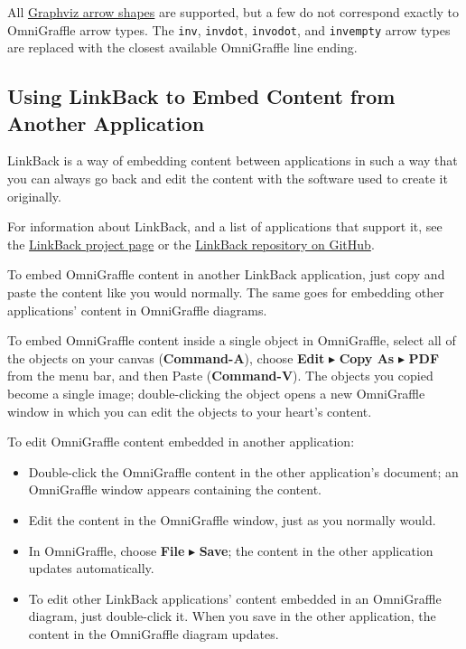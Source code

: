 \documentclass[../main.tex]{subfiles}
\begin{document}
\begin{ognote}
  All \href{http://www.graphviz.org/content/arrow-shapes}{Graphviz arrow shapes} are supported,
  but a few do not correspond exactly to OmniGraffle arrow types. The \texttt{inv},
  \texttt{invdot}, \texttt{invodot}, and \texttt{invempty} arrow types are replaced with the
  closest available OmniGraffle line ending.
\end{ognote}

\subsection{Using LinkBack to Embed Content from Another Application}

LinkBack is a way of embedding content between applications in such a way that you can always go
back and edit the content with the software used to create it originally.

\begin{ognote}
  For information about LinkBack, and a list of applications that support it, see the
  \href{http://linkback.org}{LinkBack project page} or the
  \href{http://github.com/omnigroup/LinkBack}{LinkBack repository on GitHub}.
\end{ognote}

To embed OmniGraffle content in another LinkBack application, just copy and paste the content
like you would normally. The same goes for embedding other applications' content in
OmniGraffle diagrams.

To embed OmniGraffle content inside a single object in OmniGraffle, select all of the objects on
your canvas (\textbf{Command-A}), choose \textbf{Edit} $\blacktriangleright$ \textbf{Copy As}
$\blacktriangleright$ \textbf{PDF} from the menu bar, and then Paste (\textbf{Command-V}). The
objects you copied become a single image; double-clicking the object opens a new OmniGraffle
window in which you can edit the objects to your heart's content.

To edit OmniGraffle content embedded in another application:

\begin{itemize}
  \item Double-click the OmniGraffle content in the other application's document; an OmniGraffle
    window appears containing the content.
  \item Edit the content in the OmniGraffle window, just as you normally would.
  \item In OmniGraffle, choose \textbf{File} $\blacktriangleright$ \textbf{Save}; the content in
    the other application updates automatically.
  \item To edit other LinkBack applications' content embedded in an OmniGraffle diagram, just
    double-click it. When you save in the other application, the content in the OmniGraffle
    diagram updates.
\end{itemize}
\end{document}
